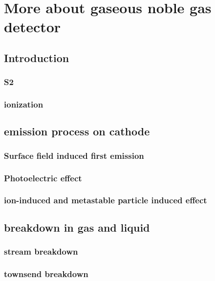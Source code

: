 \chapter{More about gaseous noble gas detector}
\section{Introduction}
\subsection{S2}
\subsection{ionization}
\section{emission process on cathode}
\subsection{Surface field induced first emission}
\subsection{Photoelectric effect}
\subsection{ion-induced and metastable particle induced effect}
\section{breakdown in gas and liquid}
\subsection{stream breakdown}
\subsection{townsend breakdown}